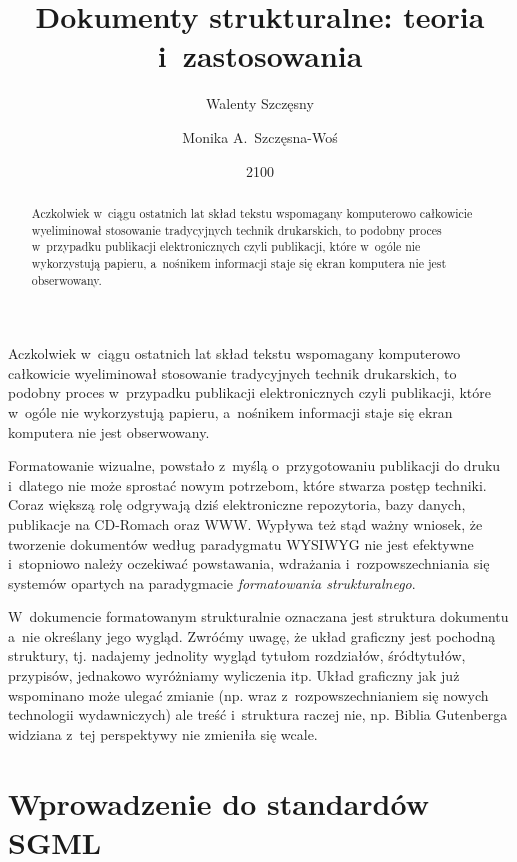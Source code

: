 \documentclass[brudnopis]{xmgr}
\author   {Walenty Szczęsny}
\author   {Monika A.~Szczęsna-Woś}
\title    {Dokumenty strukturalne: teoria i~zastosowania}
\date     {2100}
\begin{document}
\begin{abstract}
  Aczkolwiek w~ciągu ostatnich lat skład tekstu wspomagany komputerowo
  całkowicie wyeliminował stosowanie tradycyjnych technik drukarskich,
  to podobny proces w~przypadku publikacji elektronicznych czyli
  publikacji, które w~ogóle nie wykorzystują papieru, a~nośnikem
  informacji staje się ekran komputera nie jest obserwowany.
\end{abstract}


\maketitle

\introduction

Aczkolwiek w~ciągu ostatnich lat skład tekstu wspomagany
komputerowo całkowicie wyeliminował stosowanie tradycyjnych technik
drukarskich, to podobny proces w~przypadku publikacji elektronicznych
czyli publikacji, które w~ogóle nie wykorzystują papieru, a~nośnikem
informacji staje się ekran komputera nie jest obserwowany.

Formatowanie wizualne, powstało z~myślą o~przygotowaniu publikacji do
druku i~dlatego nie może sprostać nowym potrzebom, które stwarza
postęp techniki. Coraz większą rolę odgrywają dziś elektroniczne
repozytoria, bazy danych, publikacje na CD-Romach oraz WWW.  Wypływa
też stąd ważny wniosek, że tworzenie dokumentów według paradygmatu
WYSIWYG nie jest efektywne i~stopniowo należy oczekiwać powstawania,
wdrażania i~rozpowszechniania się systemów opartych na paradygmacie
\emph{formatowania strukturalnego}.

W~dokumencie formatowanym strukturalnie oznaczana jest struktura
dokumentu a~nie określany jego wygląd. Zwróćmy uwagę, że układ
graficzny jest pochodną struktury, tj. nadajemy jednolity wygląd
tytułom rozdziałów, śródtytułów, przypisów, jednakowo wyróżniamy
wyliczenia itp.  Układ graficzny jak już wspominano może ulegać zmianie
(np. wraz z~rozpowszechnianiem się nowych technologii wydawniczych)
ale treść i~struktura raczej nie, np. Biblia Gutenberga widziana z~tej
perspektywy nie zmieniła się wcale.

\chapter{Wprowadzenie do standardów SGML}
\end{document}
